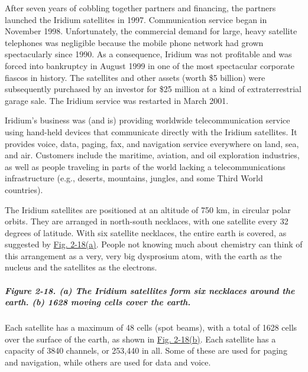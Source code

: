 After seven years of cobbling together partners and financing, the
partners launched the Iridium satellites in 1997. Communication service
began in November 1998. Unfortunately, the commercial demand for large,
heavy satellite telephones was negligible because the mobile phone
network had grown spectacularly since 1990. As a consequence, Iridium
was not profitable and was forced into bankruptcy in August 1999 in one
of the most spectacular corporate fiascos in history. The satellites and
other assets (worth \$5 billion) were subsequently purchased by an
investor for \$25 million at a kind of extraterrestrial garage sale. The
Iridium service was restarted in March 2001.

Iridium's business was (and is) providing worldwide telecommunication
service using hand-held devices that communicate directly with the
Iridium satellites. It provides voice, data, paging, fax, and navigation
service everywhere on land, sea, and air. Customers include the
maritime, aviation, and oil exploration industries, as well as people
traveling in parts of the world lacking a telecommunications
infrastructure (e.g., deserts, mountains, jungles, and some Third World
countries).

The Iridium satellites are positioned at an altitude of 750 km, in
circular polar orbits. They are arranged in north-south necklaces, with
one satellite every 32 degrees of latitude. With six satellite
necklaces, the entire earth is covered, as suggested by
\protect\hyperlink{0130661023_ch02lev1sec4.htmlux5cux23ch02fig18}{Fig.
2-18(a)}. People not knowing much about chemistry can think of this
arrangement as a very, very big dysprosium atom, with the earth as the
nucleus and the satellites as the electrons.

\subparagraph[Figure 2-18. (a) The Iridium satellites form six necklaces
around the earth. (b) 1628 moving cells cover the
earth.]{\texorpdfstring{\protect\hypertarget{0130661023_ch02lev1sec4.htmlux5cux23ch02fig18}{}{}Figure
2-18. (a) The Iridium satellites form six necklaces around the earth.
(b) 1628 moving cells cover the
earth.}{Figure 2-18. (a) The Iridium satellites form six necklaces around the earth. (b) 1628 moving cells cover the earth.}}


Each satellite has a maximum of 48 cells (spot beams), with a total of
1628 cells over the surface of the earth, as shown in
\protect\hyperlink{0130661023_ch02lev1sec4.htmlux5cux23ch02fig18}{Fig.
2-18(b)}. Each satellite has a capacity of 3840 channels, or 253,440 in
all. Some of these are used for paging and navigation, while others are
used for data and voice.

